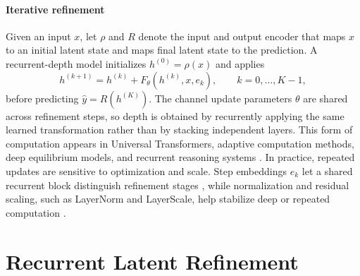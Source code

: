 \documentclass{article}
\begin{document}
\paragraph{Iterative refinement}
Given an input $x$, let $\rho$ and $R$ denote the input and output encoder that maps $x$ to an initial latent state and maps final latent state to the prediction. A recurrent-depth model initializes $h^{(0)}=\rho(x)$ and applies
\begin{equation}
h^{(k+1)}
=
h^{(k)} + F_{\theta}(h^{(k)}, x, e_k),
\qquad
k=0,\ldots,K-1,
\end{equation}
before predicting $\hat y = R(h^{(K)})$. The channel update parameters $\theta$ are shared across refinement steps, so depth is obtained by recurrently applying the same learned transformation rather than by stacking independent layers. This form of computation appears in Universal Transformers, adaptive computation methods, deep equilibrium models, and recurrent reasoning systems \citep{universal_transformer, act, deq, recurrent_relational_networks, energy_diffusion, hrm, trm, urm}. In practice, repeated updates are sensitive to optimization and scale. Step embeddings $e_k$ let a shared recurrent block distinguish refinement stages \citep{universal_transformer}, while normalization and residual scaling, such as LayerNorm and LayerScale, help stabilize deep or repeated computation \citep{layer_norm, layerscale}.

\section{Recurrent Latent Refinement}
\label{sec:architecture}
\end{document}
